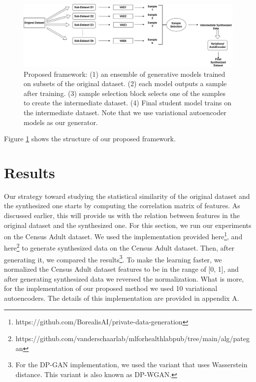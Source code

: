 \documentclass{article}
\begin{document}
\begin{figure}[htp]
    \centering
    \includegraphics[width=1\textwidth]{images/framework.jpg}
    \caption{Proposed framework: (1) an ensemble of generative models trained on subsets of the original dataset. (2) each model outputs a sample after training. (3) sample selection block selects one of the samples to create the intermediate dataset. (4) Final student model trains on the intermediate dataset. Note that we use variational autoencoder models as our generator.}
    \label{fig:framework}
\end{figure}

Figure \ref{fig:framework} shows the structure of our proposed framework.


\section{Results}

Our strategy toward studying the statistical similarity of the original dataset and the synthesized one starts by computing the correlation matrix of features. As discussed earlier, this will provide us with the relation between features in the original dataset and the synthesized one. For this section, we run our experiments on the Census Adult dataset. We used the implementation provided here\footnote{https://github.com/BorealisAI/private-data-generation}, and here\footnote{https://github.com/vanderschaarlab/mlforhealthlabpub/tree/main/alg/pategan} to generate synthesized data on the Census Adult dataset. Then, after generating it, we compared the results\footnote{For the DP-GAN implementation, we used the variant that uses Wasserstein distance. This variant is also known as DP-WGAN.}. To make the learning faster, we normalized the Census Adult dataset features to be in the range of [0, 1], and after generating synthesized data we reversed the normalization. What is more, for the implementation of our proposed method we used 10 variational autoencoders. The details of this implementation are provided in appendix A.
\end{document}

